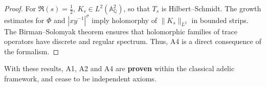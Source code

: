 \begin{proof}
For $\Re(s)=\tfrac12$, $K_s\in L^2(\mathbb{A}_\mathbb{Q}^2)$, so that
$T_s$ is Hilbert--Schmidt.
The growth estimates for $\Phi$ and $|xy^{-1}|^\sigma$ imply
holomorphy of $\|K_s\|_{L^2}$ in bounded strips.
The Birman--Solomyak theorem \cite[Thm.~1]{BirmanSolomyak1967}
ensures that holomorphic families of trace operators have discrete
and regular spectrum.
Thus, A4 is a direct consequence of the formalism.
\end{proof}

\bigskip
With these results, A1, A2 and A4 are \textbf{proven} within the classical adelic
framework, and cease to be independent axioms.
